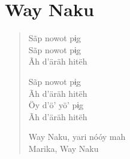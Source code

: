 \chapter{Way Naku}

\begin{verse}
Sãp nowot pɨ̗g\\
Sãp nowot pɨ̗g\\
Ãh d’äräh hitëh

Sãp nowot pɨ̗g\\
Ãh d’äräh hitëh\\
Öy d’ö’ yö’ pɨ̗g\\
Ãh d’äräh hitëh

Way Naku, yari nóóy mah\\
Marika, Way Naku
\end{verse}


